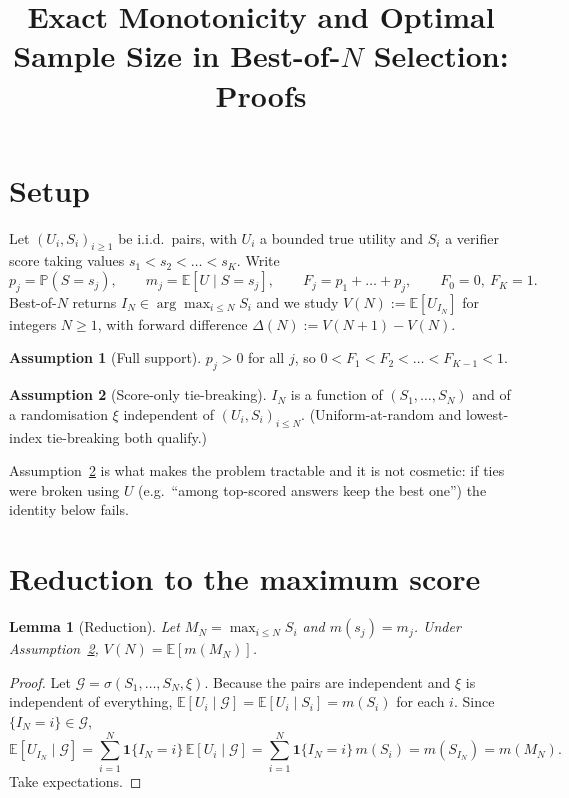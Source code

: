 \documentclass[11pt]{article}
\title{Exact Monotonicity and Optimal Sample Size in Best-of-$N$ Selection:\\ Proofs}
\author{}
\date{}
\newtheorem{lemma}{Lemma}
\theoremstyle{definition}
\newtheorem{assumption}{Assumption}
\theoremstyle{remark}
\newcommand{\E}{\mathbb{E}}
\renewcommand{\Pr}{\mathbb{P}}
\begin{document}
\maketitle

\section{Setup}

Let $(U_i,S_i)_{i\ge 1}$ be i.i.d.\ pairs, with $U_i$ a bounded true utility and
$S_i$ a verifier score taking values $s_1<s_2<\dots<s_K$. Write
\[
p_j=\Pr(S=s_j),\qquad m_j=\E[U\mid S=s_j],\qquad F_j=p_1+\dots+p_j ,\qquad F_0=0,\ F_K=1 .
\]
Best-of-$N$ returns $I_N\in\arg\max_{i\le N}S_i$ and we study
$V(N):=\E[U_{I_N}]$ for integers $N\ge 1$, with forward difference
$\Delta(N):=V(N+1)-V(N)$.

\begin{assumption}[Full support]\label{as:supp}
$p_j>0$ for all $j$, so $0<F_1<F_2<\dots<F_{K-1}<1$.
\end{assumption}

\begin{assumption}[Score-only tie-breaking]\label{as:tie}
$I_N$ is a function of $(S_1,\dots,S_N)$ and of a randomisation $\xi$ independent of
$(U_i,S_i)_{i\le N}$. (Uniform-at-random and lowest-index tie-breaking both qualify.)
\end{assumption}

Assumption~\ref{as:tie} is what makes the problem tractable and it is not cosmetic:
if ties were broken using $U$ (e.g.\ ``among top-scored answers keep the best one'')
the identity below fails.

\section{Reduction to the maximum score}

\begin{lemma}[Reduction]\label{lem:red}
Let $M_N=\max_{i\le N}S_i$ and $m(s_j)=m_j$. Under Assumption~\ref{as:tie},
$V(N)=\E[m(M_N)]$.
\end{lemma}

\begin{proof}
Let $\mathcal G=\sigma(S_1,\dots,S_N,\xi)$. Because the pairs are independent and $\xi$
is independent of everything, $\E[U_i\mid\mathcal G]=\E[U_i\mid S_i]=m(S_i)$ for each $i$.
Since $\{I_N=i\}\in\mathcal G$,
\[
\E[U_{I_N}\mid\mathcal G]=\sum_{i=1}^N \mathbf 1\{I_N=i\}\,\E[U_i\mid\mathcal G]
=\sum_{i=1}^N \mathbf 1\{I_N=i\}\,m(S_i)=m(S_{I_N})=m(M_N).
\]
Take expectations.
\end{proof}
\end{document}
